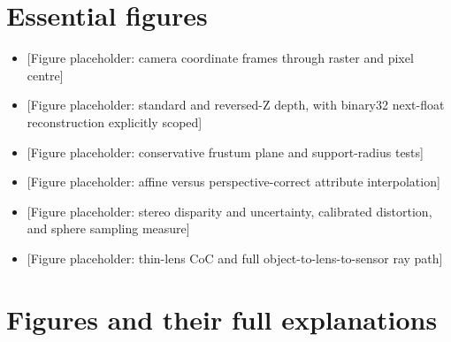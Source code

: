\section{Essential figures}\label{appendix-a2b71a18f5a2-essential-figures}

\begin{itemize}
\tightlist
\item
  {[}Figure placeholder: camera coordinate frames through raster and pixel centre{]}
\item
  {[}Figure placeholder: standard and reversed-Z depth, with binary32 next-float reconstruction explicitly scoped{]}
\item
  {[}Figure placeholder: conservative frustum plane and support-radius tests{]}
\item
  {[}Figure placeholder: affine versus perspective-correct attribute interpolation{]}
\item
  {[}Figure placeholder: stereo disparity and uncertainty, calibrated distortion, and sphere sampling measure{]}
\item
  {[}Figure placeholder: thin-lens CoC and full object-to-lens-to-sensor ray path{]}
\end{itemize}

\section{Figures and their full explanations}\label{appendix-a2b71a18f5a2-figures-and-their-full-explanations}

